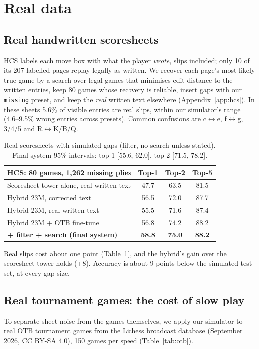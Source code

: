 \documentclass[11pt]{article}
\begin{document}
\section{Real data}

\subsection{Real handwritten scoresheets}
HCS \citep{eicher2021hcs} labels each move box with what the player \emph{wrote}, slips included; only 10 of its 207 labelled pages replay legally as written. We recover each page's most likely true game by a search over legal games that minimises edit distance to the written entries, keep 80 games whose recovery is reliable, insert gaps with our \texttt{missing} preset, and keep the \emph{real} written text elsewhere (Appendix~\ref{app:hcs}). In these sheets 5.6\% of visible entries are real slips, within our simulator's range (4.6--9.5\% wrong entries across presets). Common confusions are c$\leftrightarrow$e, f$\leftrightarrow$g, 3/4/5 and R$\leftrightarrow$K/B/Q.

\begin{table}[t]
\centering
\small
\begin{tabular}{lccc}
\toprule
HCS: 80 games, 1,262 missing plies & Top-1 & Top-2 & Top-5 \\
\midrule
Scoresheet tower alone, real written text & 47.7 & 63.5 & 81.5 \\
Hybrid 23M, corrected text & 56.5 & 72.0 & 87.7 \\
Hybrid 23M, real written text & 55.5 & 71.6 & 87.4 \\
Hybrid 23M + OTB fine-tune & 56.8 & 74.2 & 88.2 \\
\textbf{+ filter + search (final system)} & \textbf{58.8} & \textbf{75.0} & \textbf{88.2} \\
\bottomrule
\end{tabular}
\caption{Real scoresheets with simulated gaps (filter, no search unless stated). Final system 95\% intervals: top-1 [55.6, 62.0], top-2 [71.5, 78.2].}
\label{tab:hcs}
\end{table}

Real slips cost about one point (Table~\ref{tab:hcs}), and the hybrid's gain over the scoresheet tower holds (+8). Accuracy is about 9 points below the simulated test set, at every gap size.

\subsection{Real tournament games: the cost of slow play}
\label{sec:otb}
To separate sheet noise from the games themselves, we apply our simulator to real OTB tournament games from the Lichess broadcast database \citep{lichessdb} (September 2026, CC BY-SA 4.0), 150 games per speed (Table~\ref{tab:otb}).
\end{document}

